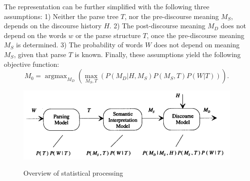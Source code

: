 \documentclass[paper=a4, fontsize=18pt]{article} %
\numberwithin{equation}{section} %
\numberwithin{figure}{section} %
\numberwithin{table}{section} %
\begin{document}
The representation can be further simplified with the following three assumptions: 1) Neither the parse tree $T$, nor the pre-discourse meaning $M_S$, depends on the discourse history $H$. 2) The post-discourse meaning $M_D$ does not depend on the words $w$ or the parse structure $T$, once the pre-discourse meaning $M_S$ is determined. 3) The probability of words $W$ does not depend on meaning $M_S$, given that parse $T$ is known. Finally, these assumptions yield the following objective function:
$$M_0 = \mathop{\arg \max}_{M_D} (\max_{M_S, T}(P( M_D | H, M_S) P(M_S, T) P(W | T))).$$
\begin{figure}[h]
  \centering
  \includegraphics[width=.9\linewidth]{stat_NLI1.png}\\
  \caption{Overview of statistical processing}\label{fig:stat_NLI1}
\end{figure}
\end{document}
